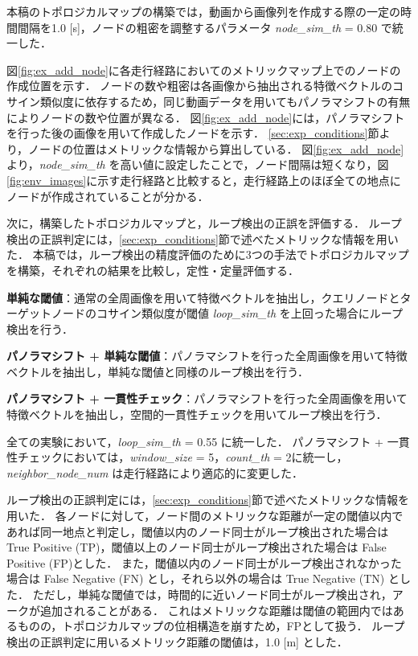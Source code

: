 \documentclass[conference]{IEEEtran}
\begin{document}
本稿のトポロジカルマップの構築では，動画から画像列を作成する際の一定の時間間隔を1.0 [s]，ノードの粗密を調整するパラメータ \textit{node\_sim\_th} = 0.80 で統一した．

図\ref{fig:ex_add_node}に各走行経路においてのメトリックマップ上でのノードの作成位置を示す．
ノードの数や粗密は各画像から抽出される特徴ベクトルのコサイン類似度に依存するため，同じ動画データを用いてもパノラマシフトの有無によりノードの数や位置が異なる．
図\ref{fig:ex_add_node}には，パノラマシフトを行った後の画像を用いて作成したノードを示す．
\ref{sec:exp_conditions}節より，ノードの位置はメトリックな情報から算出している．
図\ref{fig:ex_add_node}より，\textit{node\_sim\_th} を高い値に設定したことで，ノード間隔は短くなり，図\ref{fig:env_images}に示す走行経路と比較すると，走行経路上のほぼ全ての地点にノードが作成されていることが分かる．

次に，構築したトポロジカルマップと，ループ検出の正誤を評価する．
ループ検出の正誤判定には，\ref{sec:exp_conditions}節で述べたメトリックな情報を用いた．
本稿では，ループ検出の精度評価のために3つの手法でトポロジカルマップを構築，それぞれの結果を比較し，定性・定量評価する．

\textbf{単純な閾値}：通常の全周画像を用いて特徴ベクトルを抽出し，クエリノードとターゲットノードのコサイン類似度が閾値 \textit{loop\_sim\_th} を上回った場合にループ検出を行う．

\textbf{パノラマシフト + 単純な閾値}：パノラマシフトを行った全周画像を用いて特徴ベクトルを抽出し，単純な閾値と同様のループ検出を行う．

\textbf{パノラマシフト + 一貫性チェック}：パノラマシフトを行った全周画像を用いて特徴ベクトルを抽出し，空間的一貫性チェックを用いてループ検出を行う．

全ての実験において，\textit{loop\_sim\_th} = 0.55 に統一した．
パノラマシフト + 一貫性チェックにおいては，\textit{window\_size} = 5，\textit{count\_th} = 2に統一し，\textit{neighbor\_node\_num} は走行経路により適応的に変更した．

ループ検出の正誤判定には，\ref{sec:exp_conditions}節で述べたメトリックな情報を用いた．
各ノードに対して，ノード間のメトリックな距離が一定の閾値以内であれば同一地点と判定し，閾値以内のノード同士がループ検出された場合は True Positive (TP)，閾値以上のノード同士がループ検出された場合は False Positive (FP)とした．
また，閾値以内のノード同士がループ検出されなかった場合は False Negative (FN) とし，それら以外の場合は True Negative (TN) とした．
ただし，単純な閾値では，時間的に近いノード同士がループ検出され，アークが追加されることがある．
これはメトリックな距離は閾値の範囲内ではあるものの，トポロジカルマップの位相構造を崩すため，FPとして扱う．
ループ検出の正誤判定に用いるメトリック距離の閾値は，1.0 [m] とした．
\end{document}
